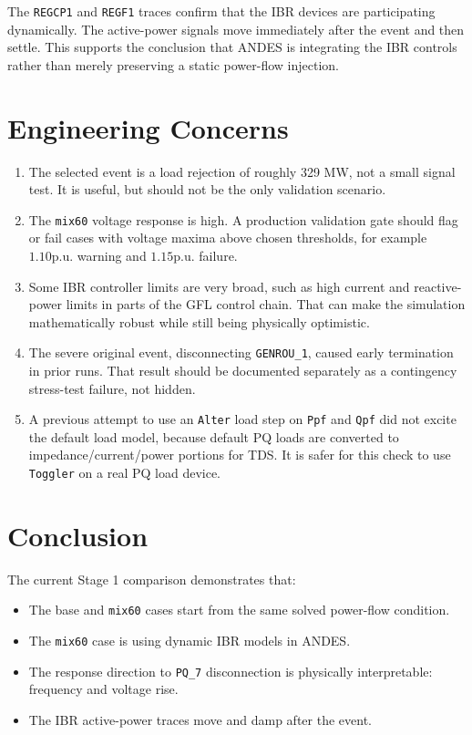 \documentclass[11pt,letterpaper]{article}
\newcommand{\pu}{\mathrm{p.u.}}
\begin{document}
The \texttt{REGCP1} and \texttt{REGF1} traces confirm that the IBR devices are
participating dynamically. The active-power signals move immediately after the
event and then settle. This supports the conclusion that ANDES is integrating
the IBR controls rather than merely preserving a static power-flow injection.

\section{Engineering Concerns}

\begin{enumerate}
  \item The selected event is a load rejection of roughly 329 MW, not a small
  signal test. It is useful, but should not be the only validation scenario.

  \item The \texttt{mix60} voltage response is high. A production validation
  gate should flag or fail cases with voltage maxima above chosen thresholds,
  for example \(1.10 \pu\) warning and \(1.15 \pu\) failure.

  \item Some IBR controller limits are very broad, such as high current and
  reactive-power limits in parts of the GFL control chain. That can make the
  simulation mathematically robust while still being physically optimistic.

  \item The severe original event, disconnecting \texttt{GENROU\_1}, caused
  early termination in prior runs. That result should be documented separately
  as a contingency stress-test failure, not hidden.

  \item A previous attempt to use an \texttt{Alter} load step on \texttt{Ppf}
  and \texttt{Qpf} did not excite the default load model, because default PQ
  loads are converted to impedance/current/power portions for TDS. It is safer
  for this check to use \texttt{Toggler} on a real PQ load device.
\end{enumerate}

\section{Conclusion}

The current Stage 1 comparison demonstrates that:

\begin{itemize}
  \item The base and \texttt{mix60} cases start from the same solved power-flow
  condition.
  \item The \texttt{mix60} case is using dynamic IBR models in ANDES.
  \item The response direction to \texttt{PQ\_7} disconnection is physically
  interpretable: frequency and voltage rise.
  \item The IBR active-power traces move and damp after the event.
\end{itemize}
\end{document}
